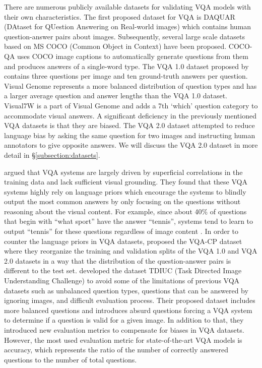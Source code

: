 \documentclass{article}
\begin{document}
There are numerous publicly available datasets for validating VQA models with their own characteristics. The first proposed dataset for VQA is DAQUAR (DAtaset for QUestion Answering on Real-world images) \citep{malinowski2014vqa} which contains human question-answer pairs about images. Subsequently, several large scale datasets based on MS COCO (Common Object in Context) \citep{coco} have been proposed. COCO-QA \citet{ren2015exploring} uses COCO image captions to automatically generate questions from them and produces answers of a single-word type. The VQA 1.0 dataset proposed by \citet{antol2015vqa} contains three questions per image and ten ground-truth answers per question. Visual Genome \citep{krishnavisualgenome} represents a more balanced distribution of question types and has a larger average question and answer lengths than the VQA 1.0 dataset. Visual7W \citep{zhu2016cvpr} is a part of Visual Genome and adds a 7th `which' question category to accommodate visual answers. A significant deficiency in the previously mentioned VQA datasets is that they are biased. The VQA 2.0 dataset \citep{goyal2017vqa2} attempted to reduce language bias by asking the same question for two images and instructing human annotators to give opposite answers. We will discuss the VQA 2.0 dataset in more detail in \S \ref{subsection:datasets}.

\citet{agrawal12018gvqa} argued that VQA systems are largely driven by superficial correlations in the training data and lack sufficient visual grounding. They found that these VQA systems highly rely on language priors which encourage the systems to blindly output the most common answers by only focusing on the questions without reasoning about the visual content. For example, since about 40\% of questions that begin with ``what sport'' have the answer ``tennis'', systems tend to learn to output ``tennis'' for these questions regardless of image content \citep{wu2019self}. In order to counter the language priors in VQA datasets, \citet{agrawal12018gvqa} proposed the VQA-CP dataset where they reorganize the training and validation splits of the VQA 1.0 and VQA 2.0 datasets in a way that the distribution of the question-answer pairs is different to the test set.
\citet{kafle2017tdiuc} developed the dataset TDIUC (Task Directed Image Understanding Challenge) to avoid some of the limitations of previous VQA datasets such as unbalanced question types, questions that can be answered by ignoring images, and difficult evaluation process. Their proposed dataset includes more balanced questions and introduces absurd questions forcing a VQA system to determine if a question is valid for a given image. In addition to that, they introduced new evaluation metrics to compensate for biases in VQA datasets. However, the most used evaluation metric for state-of-the-art VQA models is accuracy, which represents the ratio of the number of correctly answered questions to the number of total questions.
\end{document}
